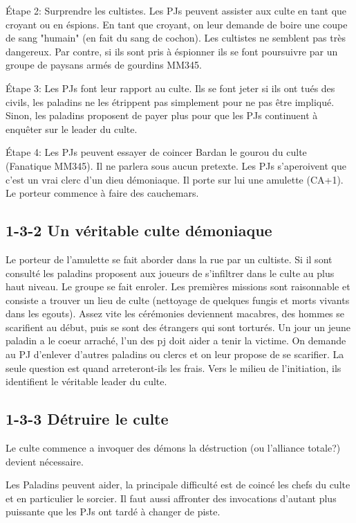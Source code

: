 Étape 2: Surprendre les cultistes. Les PJs peuvent assister aux culte en tant que croyant ou en éspions.
En tant que croyant, on leur demande de boire une coupe de sang "humain" (en fait du sang de cochon).
Les cultistes ne semblent pas très dangereux. Par contre, si ils sont pris à éspionner ils se font 
poursuivre par un groupe de paysans armés de gourdins MM345.

Étape 3: Les PJs font leur rapport au culte. Ils se font jeter si ils ont tués des civils, les paladins ne 
les étrippent pas simplement pour ne pas être impliqué. Sinon, les paladins proposent de payer plus pour 
que les PJs continuent à enquêter sur le leader du culte.

Étape 4: Les PJs peuvent essayer de coincer Bardan le gourou du culte (Fanatique MM345). Il ne parlera
sous aucun pretexte. Les PJs s'aperoivent que c'est un vrai clerc d'un dieu démoniaque. Il porte sur lui 
une amulette (CA+1). Le porteur commence à faire des cauchemars.

\subsection*{1-3-2 Un véritable culte démoniaque}

Le porteur de l'amulette se fait aborder dans la rue par un cultiste. Si il sont consulté les paladins
proposent aux joueurs de s'infiltrer dans le culte au plus haut niveau. Le groupe se fait enroler. 
Les premières missions sont raisonnable et consiste a trouver un lieu de culte (nettoyage de quelques
fungis et morts vivants dans les egouts). Assez vite les cérémonies deviennent macabres, des hommes se 
scarifient au début, puis se sont des étrangers qui sont torturés. Un jour un jeune paladin a le coeur 
arraché, l'un des pj doit aider a tenir la victime. On demande au PJ d'enlever d'autres paladins ou
clercs et on leur propose de se scarifier. La seule question est quand arreteront-ils les frais. Vers le 
milieu de l'initiation, ils identifient le véritable leader du culte.

\subsection*{1-3-3 Détruire le culte}

Le culte commence a invoquer des démons la déstruction (ou l'alliance totale?) devient nécessaire.

Les Paladins peuvent aider, la principale difficulté est de coincé les chefs du culte et en particulier
le sorcier. Il faut aussi affronter des invocations d'autant plus puissante que les PJs ont tardé à changer
de piste. 




